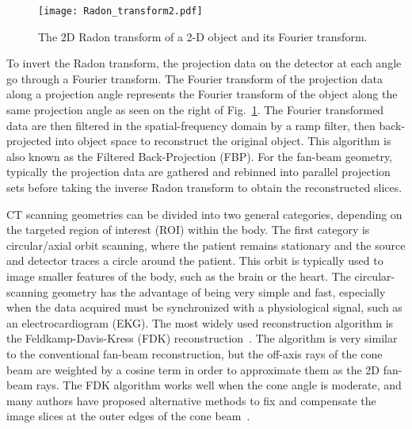 \begin{figure}[h]
\centering
\texttt{[image: Radon\_transform2.pdf]}
\caption{The 2D Radon transform of a 2-D object and its Fourier transform.}
\label{fig:RadonTransform}
\end{figure}
%
To invert the Radon transform, the projection data on the detector at each angle go through a Fourier transform.  The Fourier transform of the projection data along a projection angle represents the Fourier transform of the object along the same projection angle as seen on the right of Fig.~\ref{fig:RadonTransform}.  The Fourier transformed data are then filtered in the spatial-frequency domain by a ramp filter, then back-projected into object space to reconstruct the original object.  This algorithm is also known as the Filtered Back-Projection (FBP).  For the fan-beam geometry, typically the projection data are gathered and rebinned into parallel projection sets before taking the inverse Radon transform to obtain the reconstructed slices.

CT scanning geometries can be divided into two general categories, depending on the targeted region of interest (ROI) within the body.  The first category is circular/axial orbit scanning, where the patient remains stationary and the source and detector traces a circle around the patient.  This orbit is typically used to image smaller features of the body, such as the brain or the heart.  The circular-scanning geometry has the advantage of being very simple and fast, especially when the data acquired must be synchronized with a physiological signal, such as an electrocardiogram (EKG).  The most widely used reconstruction algorithm is the Feldkamp-Davis-Kress (FDK) reconstruction~\citep{Feldkamp1984}.  The algorithm is very similar to the conventional fan-beam reconstruction, but the off-axis rays of the cone beam are weighted by a cosine term in order to approximate them as the 2D fan-beam rays.  The FDK algorithm works well when the cone angle is moderate, and many authors have proposed alternative methods to fix and compensate the image slices at the outer edges of the cone beam~\citep{Katsevich2003, Chen2003, Hu1996}.

